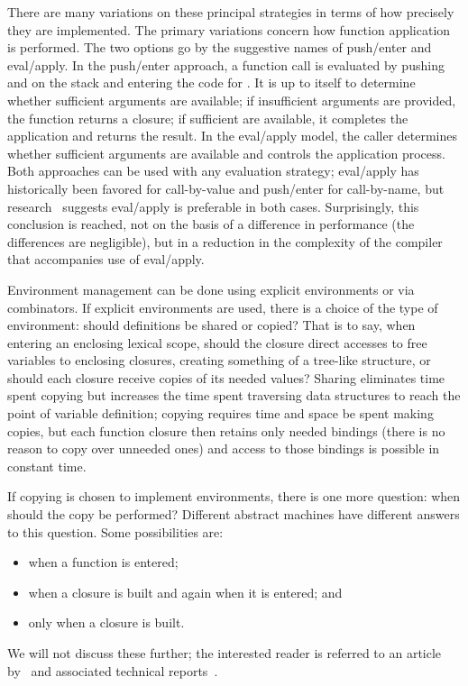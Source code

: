 There are many variations on these principal strategies in terms of how precisely they are implemented. The primary variations concern how function application is performed. The two options go by the suggestive names of push/enter and eval/apply. In the push/enter approach, a function call  is evaluated by pushing  and  on the stack and entering the code for . It is up to  itself to determine whether sufficient arguments are available; if insufficient arguments are provided, the function returns a closure; if sufficient are available, it completes the application and returns the result. In the eval/apply model, the caller determines whether sufficient arguments are available and controls the application process. Both approaches can be used with any evaluation strategy; eval/apply has historically been favored for call-by-value and push/enter for call-by-name, but research~\citep{Marlow:Making:2004} suggests eval/apply is preferable in both cases. Surprisingly, this conclusion is reached, not on the basis of a difference in performance (the differences are negligible), but in a reduction in the complexity of the compiler that accompanies use of eval/apply.

Environment management can be done using explicit environments or via combinators. If explicit environments are used, there is a choice of the type of environment: should definitions be shared or copied? That is to say, when entering an enclosing lexical scope, should the closure direct accesses to free variables to enclosing closures, creating something of a tree-like structure, or should each closure receive copies of its needed values? Sharing eliminates time spent copying but increases the time spent traversing data structures to reach the point of variable definition; copying requires time and space be spent making copies, but each function closure then retains only needed bindings (there is no reason to copy over unneeded ones) and access to those bindings is possible in constant time.

If copying is chosen to implement environments, there is one more question: when should the copy be performed? Different abstract machines have different answers to this question. Some possibilities are: 
\begin{itemize}
\item when a function is entered; 
\item when a closure is built and again when it is entered; and 
\item only when a closure is built.
\end{itemize}
We will not discuss these further; the interested reader is referred to an article by~\citet{Douence:A-systematic:1998} and associated technical reports~\citep{Douence:A-Taxonomy:1995,Douence:A-Taxonomy:1995b}.

